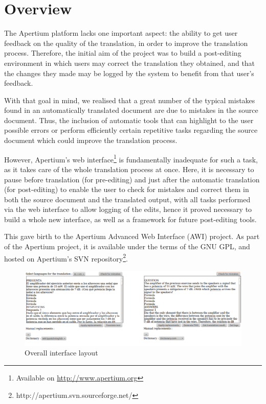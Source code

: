 \documentclass[11pt]{article}
\begin{document}
\section{Overview}

The Apertium platform lacks one important aspect: the ability to get  
user feedback on the quality of the translation, in order to 
improve the translation process. 
Therefore, the initial aim of the project was to build a post-editing 
environment in which users may correct the translation they obtained, and 
that the changes they made may be logged by the system to benefit from 
that user's feedback.

With that goal in mind, we realised that a great number of the typical 
mistakes found in an automatically translated document are due to 
mistakes in the source document. 
Thus, the inclusion of automatic tools that can highlight to the user 
possible errors or perform efficiently certain repetitive tasks regarding 
the source document which could improve the translation process.

However, Apertium's web interface\footnote{Available on 
\url{http://www.apertium.org}} 
is fundamentally inadequate for such a task, as it takes care of the whole 
translation process at once. Here, it is necessary to pause before 
translation (for pre-editing) and just after the automatic translation 
(for post-editing) to enable the user to check for 
mistakes and correct them in both the source document and the translated 
output, with all tasks performed via the web interface to allow logging of 
the edits, hence it proved necessary to build a whole new interface, as 
well as a framework for future post-editing tools. 

This gave birth to the Apertium Advanced Web Interface (AWI) project.
As part of the Apertium project, it is available under the terms of the
GNU GPL, and hosted on Apertium's SVN
repository\footnote{http://apertium.svn.sourceforge.net/}.

\begin{figure}[!ht]
  \caption{\label{CaptureOverallLayout} Overall interface layout}
     \includegraphics[width=\textwidth]{CaptureOverallLayout.png}
\end{figure}
\end{document}
